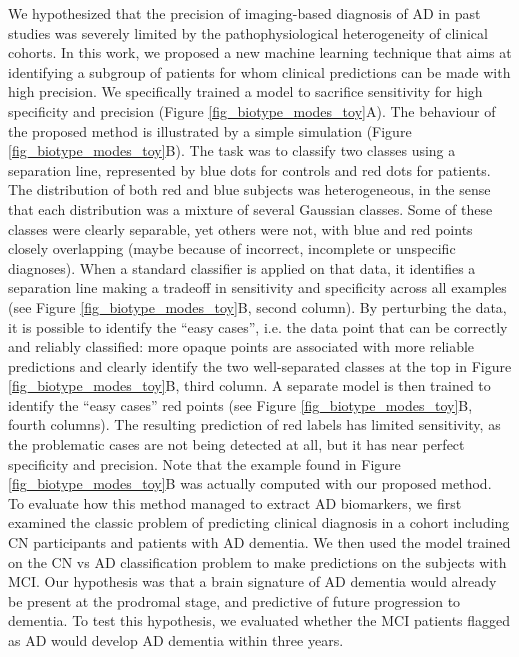 \documentclass[authoryear]{elsarticle}
\begin{document}
We hypothesized that the precision of imaging-based diagnosis of AD in past studies was severely limited by the pathophysiological heterogeneity of clinical cohorts.  In this work, we proposed a new machine learning technique that aims at identifying a subgroup of patients for whom clinical predictions can be made with high precision. We specifically trained a model to sacrifice sensitivity for high specificity and precision (Figure \ref{fig_biotype_modes_toy}A). The behaviour of the proposed method is illustrated by a simple simulation (Figure \ref{fig_biotype_modes_toy}B). The task was to classify two classes using a separation line, represented by blue dots for controls and red dots for patients. The distribution of both red and blue subjects was heterogeneous, in the sense that each distribution was a mixture of several Gaussian classes. Some of these classes were clearly separable, yet others were not, with blue and red points closely overlapping (maybe because of incorrect, incomplete or unspecific diagnoses). When a standard classifier is applied on that data, it identifies a separation line making a tradeoff in sensitivity and specificity across all examples (see Figure \ref{fig_biotype_modes_toy}B, second column). By perturbing the data, it is possible to identify the “easy cases”, i.e. the data point that can be correctly and reliably classified: more opaque points are associated with more reliable predictions and clearly identify the two well-separated classes at the top in Figure \ref{fig_biotype_modes_toy}B, third column. A separate model is then trained to identify the “easy cases” red points (see Figure \ref{fig_biotype_modes_toy}B, fourth columns). The resulting prediction of red labels has limited sensitivity, as the problematic cases are not being detected at all, but it has near perfect specificity and precision. Note that the example found in Figure \ref{fig_biotype_modes_toy}B was actually computed with our proposed method. To evaluate how this method managed to extract AD biomarkers, we first examined the classic problem of predicting clinical diagnosis in a cohort including CN participants and patients with AD dementia. We then used the model trained on the CN vs AD classification problem to make predictions on the subjects with MCI. Our hypothesis was that a brain signature of AD dementia would already be present at the prodromal stage, and predictive of future progression to dementia. To test this hypothesis, we evaluated whether the MCI patients flagged as AD would develop AD dementia within three years.
\end{document}
